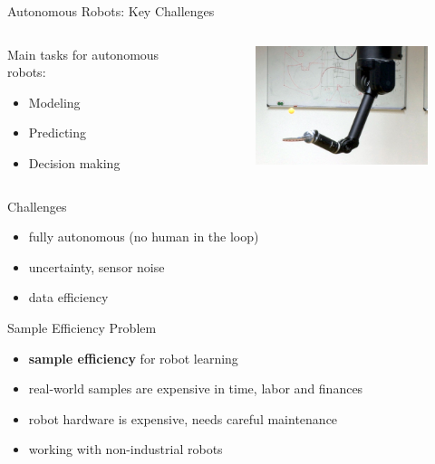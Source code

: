 \documentclass[navbarinfooter, 12pt]{sdqbeamer}
\begin{document}
\begin{frame}{Autonomous Robots: Key Challenges}
\begin{columns}[c]
  \begin{column}{7cm}
    Main tasks for autonomous robots: \\
      \begin{itemize}
      \item Modeling
      \item Predicting
      \item Decision making
      \end{itemize}
  \end{column}
  \begin{column}{5cm}
    \begin{figure}[ht]
      \centering
      \includegraphics[height=3.5cm]{figures/robot_table_tennis.png}
    \end{figure}

  \end{column}
\end{columns}  
\begin{block}{Challenges}
  \begin{itemize}
  \item fully autonomous (no human in the loop)
  \item uncertainty, sensor noise
  \item data efficiency
  \end{itemize}
\end{block}
\end{frame}


\begin{frame}{Sample Efficiency Problem}
\begin{itemize}
\item \textbf{sample efficiency} for robot learning
\item real-world samples are expensive in time, labor and finances
\item robot hardware is expensive, needs careful maintenance
\item working with non-industrial robots
\end{itemize}
\end{frame}
\end{document}
